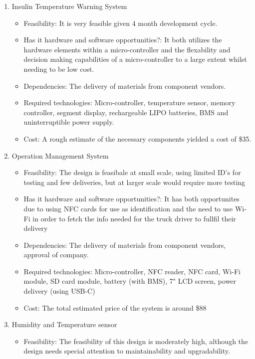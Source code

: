 \begin{enumerate}
  \item Insulin Temperature Warning System
        \begin{itemize}
          \item Feasibility: It is very feasible given 4 month development cycle.
          \item Has it hardware and software opportunities?: It both utilizes the hardware elements within a micro-controller and the flexability and decision making capabilities of a micro-controller to a large extent whilst needing to be low cost.
          \item Dependencies: The delivery of materials from component vendors.
          \item Required technologies: Micro-controller, temperature sensor, memory controller, segment display, rechargeable LIPO batteries, BMS and uninterruptible power supply.
          \item Cost: A rough estimate of the necessary components yielded a cost of \$35.
        \end{itemize}
	\item Operation Management System
	\begin{itemize}
	 \item Feasibility: The design is feasibale at small scale, using limited ID's for testing and few deliveries, but at larger scale would require more testing
          \item Has it hardware and software opportunities?: It has both opportunites due to using NFC cards for use as identification and the need to use Wi-Fi in order to fetch the info needed for the truck driver to fullfil their delivery
          \item Dependencies: The delivery of materials from component vendors, approval of company.
          \item Required technologies: Micro-controller, NFC reader, NFC card, Wi-Fi module, SD card module, battery (with BMS), 7" LCD screen, power delivery (using USB-C)
          \item Cost: The total estimated price of the system is around \$88
	\end{itemize}
        \item Humidity and Temperature sensor
        \begin{itemize}
          \item Feasibility: The feasibility of this design is moderately high, although the design needs special attention to maintainability and upgradability.

\end{itemize}
\end{enumerate}
